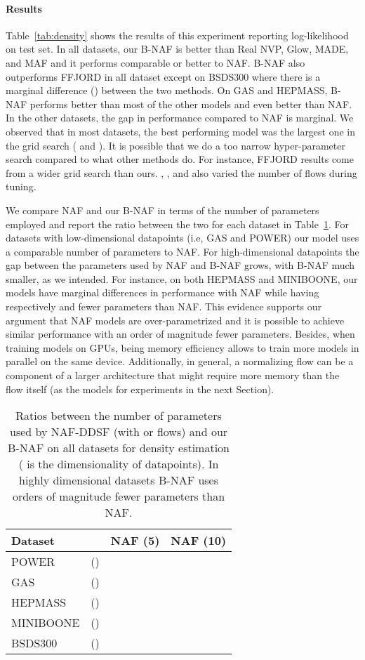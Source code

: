 \documentclass[letterpaper]{article}
\begin{document}
\paragraph{Results}
Table~\ref{tab:density} shows the results of this experiment reporting log-likelihood on test set. In all datasets, our B-NAF is better than Real NVP, Glow, MADE, and MAF and it performs comparable or better to NAF. B-NAF also outperforms FFJORD in all dataset except on BSDS300 where there is a marginal difference () between the two methods. On GAS and HEPMASS, B-NAF performs better than most of the other models and even better than NAF. In the other datasets, the gap in performance compared to NAF is marginal. We observed that in most datasets, the best performing model was the largest one in the grid search ( and ). It is possible that we do a too narrow hyper-parameter search compared to what other methods do. For instance, FFJORD results come from a wider grid search than ours. \citet{grathwohl2018ffjord}, \citet{huang2018neural}, and \citet{pmlr-v80-oliva18a} also varied the number of flows during tuning.

We compare NAF and our B-NAF in terms of the number of parameters employed and report the ratio between the two for each dataset in Table~\ref{tab:params}. For datasets with low-dimensional datapoints (i.e, GAS and POWER) our model uses a comparable number of parameters to NAF. For high-dimensional datapoints the gap between the parameters used by NAF and B-NAF grows, with B-NAF much smaller, as we intended. For instance, on both HEPMASS and MINIBOONE, our models have marginal differences in performance with NAF while having respectively  and  fewer parameters than NAF. This evidence supports our argument that NAF models are over-parametrized and it is possible to achieve similar performance with an order of magnitude fewer parameters. Besides, when training models on GPUs, being memory efficiency allows to train more models in parallel on the same device. Additionally, in general, a normalizing flow can be a component of a larger architecture that might require more memory than the flow itself (as the models for experiments in the next Section).

\begin{table}[t]
\centering
\caption{Ratios between the number of parameters used by NAF-DDSF (with  or  flows) and our B-NAF on all datasets for density estimation (
is the dimensionality of datapoints). In highly dimensional datasets B-NAF uses orders of magnitude fewer parameters than NAF.}
\begin{tabular}{lrcc}
\toprule
\textbf{Dataset} && NAF (5) & NAF (10) \\
\midrule
POWER & () &  &  \\
GAS &()&  &  \\
HEPMASS &()&  &  \\
MINIBOONE&()&  &  \\
BSDS300 &()&  &  \\
\bottomrule
\end{tabular}
\label{tab:params}
\end{table}
\end{document}

